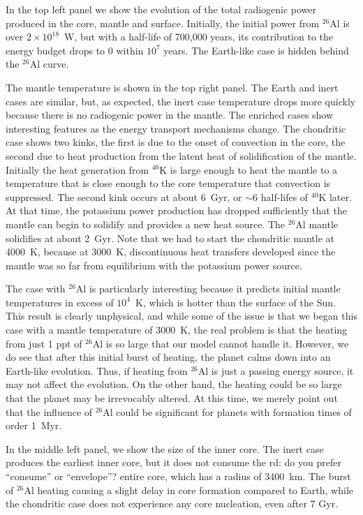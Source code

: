 \documentclass[preprint,12pt]{aastex}
\newcommand{\xxx}[1]{{\color{red} #1}} %
\begin{document}
In the top left panel we show the evolution of the total radiogenic
power produced in the core, mantle and surface. Initially, the initial
power from $^{26}$Al is over $2 \times 10^{18}$~W, but with a
half-life of 700,000 years, its contribution to the energy budget
drops to 0 within $10^7$ years. The Earth-like case is hidden behind
the $^{26}$Al curve.

The mantle temperature is shown in the top right panel. The Earth and
inert cases are similar, but, as expected, the inert case temperature
drops more quickly because there is no radiogenic power in the
mantle. The enriched cases show interesting features as the energy
transport mechanisms change. The chondritic case shows two kinks, the
first is due to the onset of convection in the core, the second due to
heat production from the latent heat of solidification of the
mantle. Initially the heat generation from $^{40}$K is large enough to
heat the mantle to a temperature that is close enough to the core
temperature that convection is suppressed. The second kink occurs at
about 6~Gyr, or $\sim$6 half-lifes of $^{40}$K later. At that time, the
potassium power production has dropped sufficiently that the mantle
can begin to solidify and provides a new heat source. The $^{26}$Al
mantle solidifies at about 2~Gyr. Note that we had to start the
chondritic mantle at 4000~K, because at 3000~K, discontinuous heat
transfers developed since the mantle was so far from equilibrium
with the potassium power source.

The case with $^{26}$Al is particularly interesting because it
predicts initial mantle temperatures in excess of $10^4$~K, which is
hotter than the \xxx{surface of the} Sun. This result is clearly unphysical, and while some of the
issue is that we began this case with a mantle temperature of 3000~K,
the real problem is that the heating from just 1 ppt of $^{26}$Al is
so large that our model cannot handle it. However, we do see that
after this initial burst of heating, the planet calms down into an
Earth-like evolution. Thus, if heating from $^{26}$Al is just a
passing energy source, it may not affect the evolution. On the other
hand, the heating could be so large that the planet may be irrevocably
altered. At this time, we merely point out that the influence of
$^{26}$Al could be significant for planets with formation times of
order 1~Myr.

In the middle left panel, we show the size of the inner core. The
inert case produces the earliest inner core, but it does not consume the
\xxx{rd: do you prefer ``consume'' or 	``envelope''?}
entire core, which has a radius of 3400~km. The burst of $^{26}$Al
heating causing a slight delay in core formation compared to Earth,
while the chondritic case does not experience any core nucleation, even
after 7 Gyr.
\end{document}
